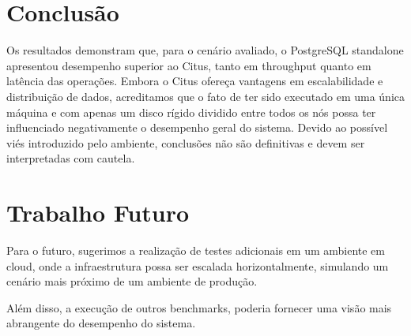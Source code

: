 \section{Conclusão}

Os resultados demonstram que, para o cenário avaliado,
o PostgreSQL standalone apresentou desempenho superior ao Citus,
tanto em throughput quanto em latência das operações. 
Embora o Citus ofereça vantagens em escalabilidade e distribuição de dados,
acreditamos que o fato de ter sido executado em uma única máquina e com apenas um disco rígido dividido entre 
todos os nós possa ter influenciado negativamente o desempenho geral do sistema.
Devido ao possível viés introduzido pelo ambiente, 
conclusões não são definitivas e devem ser interpretadas com cautela.

\section{Trabalho Futuro}
Para o futuro, sugerimos a realização de testes adicionais em um ambiente em cloud, 
onde a infraestrutura possa ser escalada horizontalmente, simulando um cenário mais próximo de um ambiente de produção.

Além disso, a execução de outros benchmarks, poderia fornecer uma visão mais abrangente do desempenho do sistema.
